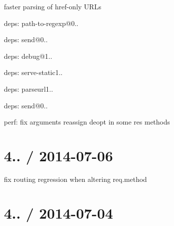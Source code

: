 {\begin{DoxyItemize}
\begin{DoxyItemize}
\item faster parsing of href-\/only U\+R\+Ls
\end{DoxyItemize}
\item deps\+: path-\/to-\/regexp@0..
\item deps\+: send@0..
\begin{DoxyItemize}
\item deps\+: debug@1..
\end{DoxyItemize}
\item deps\+: serve-\/static1..
\begin{DoxyItemize}
\item deps\+: parseurl1..
\item deps\+: send@0..
\end{DoxyItemize}
\item perf\+: fix arguments reassign deopt in some {\ttfamily res} methods
\end{DoxyItemize}}

{\ttfamily \section*{4.. / 2014-\/07-\/06 }}

{\ttfamily }

{\ttfamily 
\begin{DoxyItemize}
\item fix routing regression when altering {\ttfamily req.\+method}
\end{DoxyItemize}}

{\ttfamily \section*{4.. / 2014-\/07-\/04 }}

{\ttfamily }

